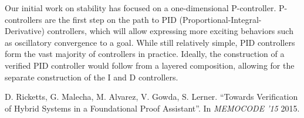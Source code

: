 \documentclass[preprint,nocopyrightspace]{sigplanconf}
\begin{document}
Our initial work on stability has focused on a one-dimensional P-controller.
P-controllers are the first step on the path to PID (Proportional-Integral-Derivative) controllers, which will allow expressing more exciting behaviors such as oscillatory convergence to a goal.
While still relatively simple, PID controllers form the vast majority of controllers in practice.
Ideally, the construction of a verified PID controller would follow from a layered composition, allowing for the separate construction of the I and D controllers.


















\begin{thebibliography}{}
\softraggedright
D. Ricketts, G. Malecha, M. Alvarez, V. Gowda, S. Lerner.
\newblock ``Towards Verification of Hybrid Systems in a Foundational Proof Assistant''.
\newblock In \emph{MEMOCODE '15} 2015.
\end{thebibliography}
\end{document}
